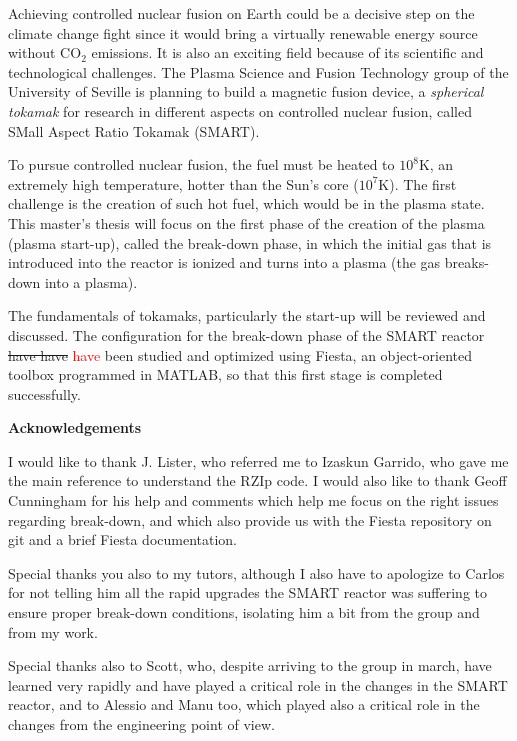 \documentclass[a4paper,12pt,oneside]{book}
\begin{document}
Achieving controlled nuclear fusion on Earth could be a decisive step on the climate change fight since it would bring a virtually renewable energy source without CO$_2$ emissions. It is also an exciting field because of its scientific and technological challenges. The Plasma Science and Fusion Technology group of the University of Seville is planning to build a magnetic fusion device, a \textit{spherical tokamak} for research in different aspects on controlled nuclear fusion, called SMall Aspect Ratio Tokamak (SMART).

To pursue controlled nuclear fusion, the fuel must be heated to $10^8$K, an extremely high temperature, hotter than the Sun's core ($10^7$K). The first challenge is the creation of such hot fuel, which would be in the plasma state. This master's thesis will focus on the first phase of the creation of the plasma (plasma start-up), called the break-down phase, in which the initial gas that is introduced into the reactor is ionized and turns into a plasma (the gas breaks-down into a plasma).

The fundamentals of tokamaks, particularly the start-up will be reviewed and discussed. The configuration for the break-down phase of the SMART reactor \st{have have} \textcolor{red}{have}  been studied and optimized using Fiesta, an object-oriented toolbox programmed in MATLAB, so that this first stage is completed successfully.


\newpage

\begin{center}
\begin{large}
\textbf{Acknowledgements}
\end{large}

\end{center}

I would like to thank J. Lister, who referred me to Izaskun Garrido, who gave me the main reference to understand the RZIp code.  I would also like to thank Geoff Cunningham for his help and comments which help me focus on the right issues regarding break-down, and which also provide us with the Fiesta repository on git and a brief Fiesta documentation.

Special thanks you also to my tutors, although I also have to apologize to Carlos for not telling him all the rapid upgrades the SMART reactor was suffering to ensure proper break-down conditions, isolating him a bit from the group and from my work.

Special thanks also to Scott, who, despite arriving to the group in march,  have learned very rapidly and have played a critical role in the changes in the SMART reactor, and to Alessio and Manu too, which played also a critical role in the changes from the engineering point of view. 
\end{document}
